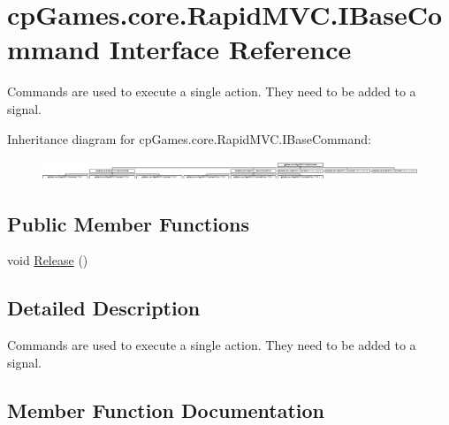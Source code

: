 \hypertarget{interfacecp_games_1_1core_1_1_rapid_m_v_c_1_1_i_base_command}{}\section{cp\+Games.\+core.\+Rapid\+M\+V\+C.\+I\+Base\+Command Interface Reference}
\label{interfacecp_games_1_1core_1_1_rapid_m_v_c_1_1_i_base_command}


Commands are used to execute a single action. They need to be added to a signal.  


Inheritance diagram for cp\+Games.\+core.\+Rapid\+M\+V\+C.\+I\+Base\+Command\+:\begin{figure}[H]
\begin{center}
\leavevmode
\includegraphics[height=0.623145cm]{interfacecp_games_1_1core_1_1_rapid_m_v_c_1_1_i_base_command}
\end{center}
\end{figure}
\subsection*{Public Member Functions}
\begin{DoxyCompactItemize}
\item 
void \mbox{\hyperlink{interfacecp_games_1_1core_1_1_rapid_m_v_c_1_1_i_base_command_aaf935c8b144d93bffac5b2e4fbe9881b}{Release}} ()
\end{DoxyCompactItemize}


\subsection{Detailed Description}
Commands are used to execute a single action. They need to be added to a signal. 



\subsection{Member Function Documentation}
\mbox{\label{interfacecp_games_1_1core_1_1_rapid_m_v_c_1_1_i_base_command_aaf935c8b144d93bffac5b2e4fbe9881b}} 
